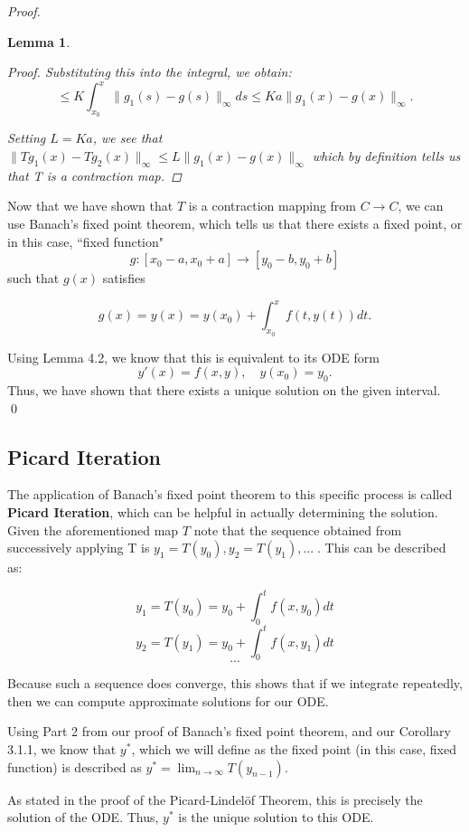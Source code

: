 \documentclass{article}
\newtheorem{lemma}[theorem]{Lemma}
\theoremstyle{remark}
\begin{document}
\begin{proof}
\begin{lemma}
\begin{proof}
Substituting this into the integral, we obtain:
$$ \leq K \int_{x_0}^x \|g_1(s) - g(s)\|_\infty ds 
\leq Ka\|g_1(x) - g(x)\|_\infty.$$

Setting $L = Ka$, we see that $\|Tg_1(x) -Tg_2(x)\|_\infty \leq L\|g_1(x) - g(x)\|_\infty$ which by definition tells us that T is a contraction map.
    \end{proof}
\end{lemma}








Now that we have shown that $T$ is a contraction mapping from $C \to C$, we can use Banach's fixed point theorem, which tells us that there exists a fixed point, or in this case, ``fixed function" $$g: [x_0 -a, x_0+a] \to [y_0 -b, y_0 +b] $$
such that $g(x)$ satisfies

$$g(x) = y(x) = y(x_0) + \int_{x_0}^xf(t, y(t))dt.$$

Using Lemma 4.2, we know that this is equivalent to its ODE form $$y'(x) = f(x, y), \quad y(x_0) = y_0.$$
Thus, we have shown that there exists a unique solution on the given interval.
\qed
\phantom\qedhere
\end{proof}

\subsection{Picard Iteration}
The application of Banach's fixed point theorem to this specific process is called \textbf{Picard Iteration}, which can be helpful in actually determining the solution. Given the aforementioned map $T$ note that the sequence obtained from successively applying T is $y_1 = T(y_0), y_2 = T(y_1), ... \; $. This can be described as:

$$y_1 = T(y_0) = y_0 + \int_0^t f(x, y_0)dt$$
$$y_2 = T(y_1) = y_0 + \int_0^t f(x, y_1)dt$$
$$...$$

Because such a sequence does converge, this shows that if we integrate repeatedly, then we can compute approximate solutions for our ODE.

Using Part 2 from our proof of Banach's fixed point theorem, and our Corollary 3.1.1, we know that $y^*$, which we will define as the fixed point (in this case, fixed function) is described as
$y^* = \lim_{n \to \infty}T(y_{n-1}).$

As stated in the proof of the Picard-Lindel\"{o}f Theorem, this is precisely the solution of the ODE. Thus, $y^*$ is the unique solution to this ODE.
\end{document}
